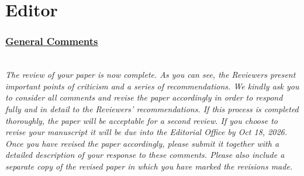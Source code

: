 \documentclass[journal,12pn, onecolumn]{IEEEtran}
\begin{document}
\newpage

\section*{\textbf{Editor}}\label{edi}

{\color{black}
\subsubsection*{\underline{General Comments}}
\emph{\\
The review of your paper is now complete. As you can see, the Reviewers present important points of criticism and a series of recommendations. We kindly ask you to consider all comments and revise the paper accordingly in order to respond fully and in detail to the Reviewers' recommendations. If this process is completed thoroughly, the paper will be acceptable for a second review. If you choose to revise your manuscript it will be due into the Editorial Office by Oct 18, 2026. Once you have revised the paper accordingly, please submit it together with a detailed description of your response to these comments. Please also include a separate copy of the revised paper in which you have marked the revisions made.
}}\\
\end{document}
